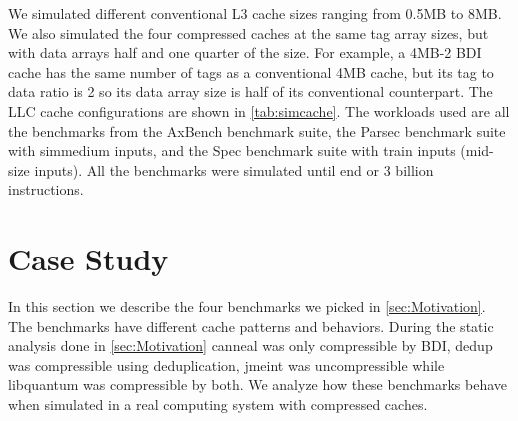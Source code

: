 We simulated different conventional L3 cache sizes ranging from 0.5MB to 8MB. We also simulated the four compressed caches at the same tag array sizes, but with data arrays half and one quarter of the size. For example, a 4MB-2 BDI cache has the same number of tags as a conventional 4MB cache, but its tag to data ratio is 2 so its data array size is half of its conventional counterpart. The LLC cache configurations are shown in \ref{tab:simcache}. The workloads used are all the benchmarks from the AxBench\cite{axbench} benchmark suite, the Parsec\cite{parsec} benchmark suite with simmedium inputs, and the Spec\cite{spec} benchmark suite with train inputs (mid-size inputs). All the benchmarks were simulated until end or 3 billion instructions.

\section{Case Study}
\label{sec:case_study}
In this section we describe the four benchmarks we picked in \ref{sec:Motivation}. The benchmarks have different cache patterns and behaviors. During the static analysis done in \ref{sec:Motivation} canneal was only compressible by BDI, dedup was compressible using deduplication, jmeint was uncompressible while libquantum was compressible by both. We analyze how these benchmarks behave when simulated in a real computing system with compressed caches.\par

